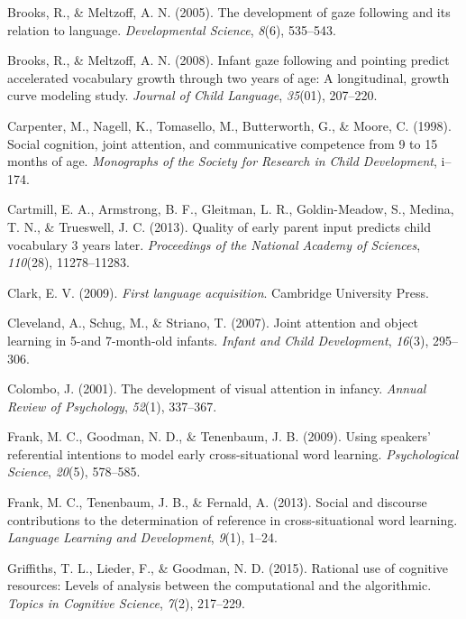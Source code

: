 \documentclass[authoryear, review]{elsarticle}
\begin{document}
\hypertarget{ref-brooks2005development}{}
Brooks, R., \& Meltzoff, A. N. (2005). The development of gaze following
and its relation to language. \emph{Developmental Science}, \emph{8}(6),
535--543.

\hypertarget{ref-brooks2008infant}{}
Brooks, R., \& Meltzoff, A. N. (2008). Infant gaze following and
pointing predict accelerated vocabulary growth through two years of age:
A longitudinal, growth curve modeling study. \emph{Journal of Child
Language}, \emph{35}(01), 207--220.

\hypertarget{ref-carpenter1998social}{}
Carpenter, M., Nagell, K., Tomasello, M., Butterworth, G., \& Moore, C.
(1998). Social cognition, joint attention, and communicative competence
from 9 to 15 months of age. \emph{Monographs of the Society for Research
in Child Development}, i--174.

\hypertarget{ref-cartmill2013quality}{}
Cartmill, E. A., Armstrong, B. F., Gleitman, L. R., Goldin-Meadow, S.,
Medina, T. N., \& Trueswell, J. C. (2013). Quality of early parent input
predicts child vocabulary 3 years later. \emph{Proceedings of the
National Academy of Sciences}, \emph{110}(28), 11278--11283.

\hypertarget{ref-clark2009first}{}
Clark, E. V. (2009). \emph{First language acquisition}. Cambridge
University Press.

\hypertarget{ref-cleveland2007joint}{}
Cleveland, A., Schug, M., \& Striano, T. (2007). Joint attention and
object learning in 5-and 7-month-old infants. \emph{Infant and Child
Development}, \emph{16}(3), 295--306.

\hypertarget{ref-colombo2001development}{}
Colombo, J. (2001). The development of visual attention in infancy.
\emph{Annual Review of Psychology}, \emph{52}(1), 337--367.

\hypertarget{ref-frank2009using}{}
Frank, M. C., Goodman, N. D., \& Tenenbaum, J. B. (2009). Using
speakers' referential intentions to model early cross-situational word
learning. \emph{Psychological Science}, \emph{20}(5), 578--585.

\hypertarget{ref-frank2013social}{}
Frank, M. C., Tenenbaum, J. B., \& Fernald, A. (2013). Social and
discourse contributions to the determination of reference in
cross-situational word learning. \emph{Language Learning and
Development}, \emph{9}(1), 1--24.

\hypertarget{ref-griffiths2015rational}{}
Griffiths, T. L., Lieder, F., \& Goodman, N. D. (2015). Rational use of
cognitive resources: Levels of analysis between the computational and
the algorithmic. \emph{Topics in Cognitive Science}, \emph{7}(2),
217--229.
\end{document}
